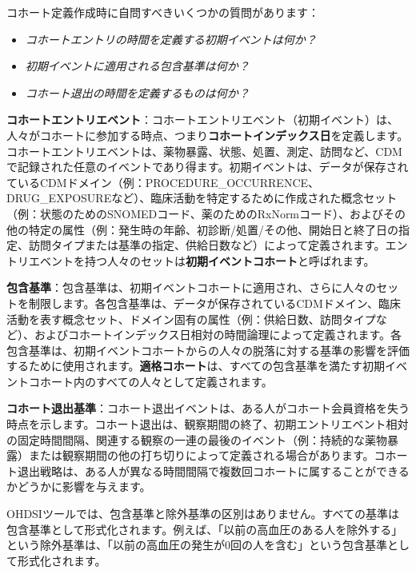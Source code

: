 \documentclass[
  11pt]{book}
\makeatletter
\providecommand{\tightlist}{%
  \setlength{\itemsep}{0pt}\setlength{\parskip}{0pt}}
\newenvironment{kframe}{%
\medskip{}
\setlength{\fboxsep}{.8em}
 \def\at@end@of@kframe{}%
 \ifinner\ifhmode%
  \def\at@end@of@kframe{\end{minipage}}%
  \begin{minipage}{\columnwidth}%
 \fi\fi%
 \def\FrameCommand##1{\hskip\@totalleftmargin \hskip-\fboxsep
 \colorbox{myShadeColor}{##1}\hskip-\fboxsep
     \hskip-\linewidth \hskip-\@totalleftmargin \hskip\columnwidth}%
 \MakeFramed {\advance\hsize-\width
   \@totalleftmargin\z@ \linewidth\hsize
   \@setminipage}}%
 {\par\unskip\endMakeFramed%
 \at@end@of@kframe}
\newenvironment{rmdblock}[1]
  {
  \begin{itemize}
  \renewcommand{\labelitemi}{
    \raisebox{-.7\height}[0pt][0pt]{
      {\setkeys{Gin}{width=3em,keepaspectratio}\texttt{[image: images/\#1]}}
    }
  }
  \setlength{\fboxsep}{1em}
  \begin{kframe}
  \item
  }
  {
  \end{kframe}
  \end{itemize}
  }
\newenvironment{rmdimportant}
  {\begin{rmdblock}{important}}
  {\end{rmdblock}}
\theoremstyle{definition}
\theoremstyle{definition}
\theoremstyle{definition}
\theoremstyle{definition}
\theoremstyle{remark}
\makeatother
\begin{document}
コホート定義作成時に自問すべきいくつかの質問があります：

\begin{itemize}
\tightlist
\item
  \emph{コホートエントリの時間を定義する初期イベントは何か？}
\item
  \emph{初期イベントに適用される包含基準は何か？}
\item
  \emph{コホート退出の時間を定義するものは何か？}
\end{itemize}

\textbf{コホートエントリエベント}：コホートエントリエベント（初期イベント）は、人々がコホートに参加する時点、つまり\textbf{コホートインデックス日}を定義します。コホートエントリエベントは、薬物暴露、状態、処置、測定、訪問など、CDMで記録された任意のイベントであり得ます。初期イベントは、データが保存されているCDMドメイン（例：PROCEDURE\_OCCURRENCE、DRUG\_EXPOSUREなど）、臨床活動を特定するために作成された概念セット（例：状態のためのSNOMEDコード、薬のためのRxNormコード）、およびその他の特定の属性（例：発生時の年齢、初診断/処置/その他、開始日と終了日の指定、訪問タイプまたは基準の指定、供給日数など）によって定義されます。エントリエベントを持つ人々のセットは\textbf{初期イベントコホート}と呼ばれます。

\textbf{包含基準}：包含基準は、初期イベントコホートに適用され、さらに人々のセットを制限します。各包含基準は、データが保存されているCDMドメイン、臨床活動を表す概念セット、ドメイン固有の属性（例：供給日数、訪問タイプなど）、およびコホートインデックス日相対の時間論理によって定義されます。各包含基準は、初期イベントコホートからの人々の脱落に対する基準の影響を評価するために使用されます。\textbf{適格コホート}は、すべての包含基準を満たす初期イベントコホート内のすべての人々として定義されます。

\textbf{コホート退出基準}：コホート退出イベントは、ある人がコホート会員資格を失う時点を示します。コホート退出は、観察期間の終了、初期エントリエベント相対の固定時間間隔、関連する観察の一連の最後のイベント（例：持続的な薬物暴露）または観察期間の他の打ち切りによって定義される場合があります。コホート退出戦略は、ある人が異なる時間間隔で複数回コホートに属することができるかどうかに影響を与えます。 

\begin{rmdimportant}
OHDSIツールでは、包含基準と除外基準の区別はありません。すべての基準は包含基準として形式化されます。例えば、「以前の高血圧のある人を除外する」という除外基準は、「以前の高血圧の発生が0回の人を含む」という包含基準として形式化されます。
\end{rmdimportant}
\end{document}
